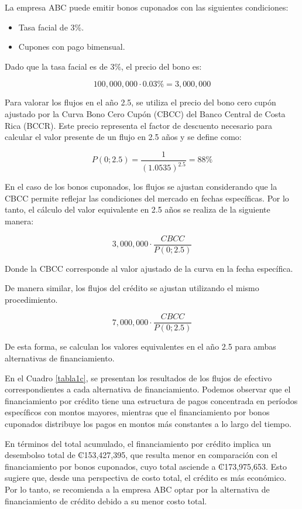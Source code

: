 \documentclass[12pt]{article}
\begin{document}
La empresa ABC puede emitir bonos cuponados con las siguientes condiciones:

\begin{itemize}
    \item Tasa facial de 3\%.
    \item Cupones con pago bimensual.
\end{itemize}

Dado que la tasa facial es de 3\%, el precio del bono es:

\[ 100,000,000 \cdot 0.03\% = 3,000,000 \] 

Para valorar los flujos en el año 2.5, se utiliza el precio del bono cero cupón ajustado por la Curva Bono Cero Cupón (CBCC) del Banco Central de Costa Rica (BCCR). Este precio representa el factor de descuento necesario para calcular el valor presente de un flujo en 2.5 años y se define como:

\[ P(0;2.5) = \frac{1}{(1.0535)^{2.5}} = 88\% \]

En el caso de los bonos cuponados, los flujos se ajustan considerando que la CBCC permite reflejar las condiciones del mercado en fechas específicas. Por lo tanto, el cálculo del valor equivalente en 2.5 años se realiza de la siguiente manera:

\[ 3,000,000 \cdot \frac{CBCC}{P(0;2.5)} \]

Donde la CBCC corresponde al valor ajustado de la curva en la fecha específica.

De manera similar, los flujos del crédito se ajustan utilizando el mismo procedimiento. 

\[ 7,000,000  \cdot \frac{CBCC}{P(0;2.5)} \]

De esta forma, se calculan los valores equivalentes en el año 2.5 para ambas alternativas de financiamiento.

En el Cuadro \ref{tabla1c}, se presentan los resultados de los flujos de efectivo correspondientes a cada alternativa de financiamiento. Podemos observar que el financiamiento por crédito tiene una estructura de pagos concentrada en períodos específicos con montos mayores, mientras que el financiamiento por bonos cuponados distribuye los pagos en montos más constantes a lo largo del tiempo. 

En términos del total acumulado, el financiamiento por crédito implica un desembolso total de ₡153,427,395, que resulta menor en comparación con el financiamiento por bonos cuponados, cuyo total asciende a ₡173,975,653. Esto sugiere que, desde una perspectiva de costo total, el crédito es más económico. Por lo tanto, se recomienda a la empresa ABC optar por la alternativa de financiamiento de crédito debido a su menor costo total.
\end{document}
